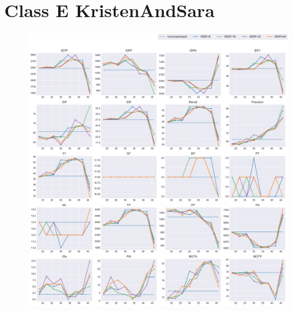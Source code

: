 
\section{Class E KristenAndSara}
\label{sec:appendix/KristenAndSara_all}


\begin{figure}[!htbp]
\centering
\includegraphics[width=1.0\linewidth]{img/appendix/KristenAndSara_all_multiplots_qp.pdf}
\caption[Result of all object classes in Class E KristenAndSara with Horizontal Axis of QP]{}
\label{fig:KristenAndSara_all_qp}
\end{figure}

